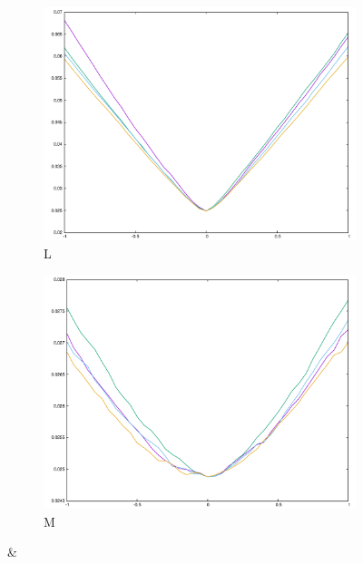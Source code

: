 \begin{figure}[H]
\begin{subfigure}{.33\textwidth}
\end{subfigure}\\
\begin{subfigure}{.33\textwidth}
	\includegraphics[width=\linewidth]{fig/ajherr/t3t/L_mae.pdf}
	\caption{L}
\end{subfigure}%
\begin{subfigure}{.33\textwidth}
	\includegraphics[width=\linewidth]{fig/ajherr/t3t/M_mae.pdf}
	\caption{M}
\end{subfigure}&
\begin{subfigure}{.33\textwidth}

\end{subfigure}
\end{figure}
